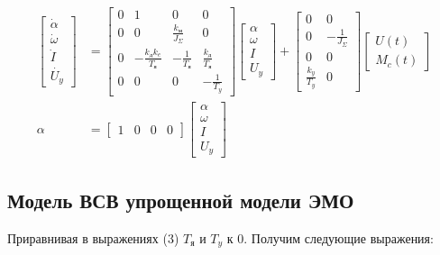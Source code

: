 \documentclass[a4paper, 12pt]{article}
\begin{document}
\begin{align}
    \begin{bmatrix}
        \dot{\alpha} \\
        \dot{\omega} \\
        \dot{I} \\
        \dot{U_y} 
    \end{bmatrix} & = 
    \begin{bmatrix}
        0 & 1 & 0 & 0 \\
        0 & 0 & \frac{k_\text{м}}{J_\Sigma} & 0 \\
        0 & -\frac{k_\text{д}k_e}{T_\text{я}} & - \frac{1}{T_\text{я}} & \frac{k_\text{д}}{T_\text{я}} \\
        0 & 0 & 0 & -\frac{1}{T_y}
    \end{bmatrix}
    \begin{bmatrix}
        \alpha \\
        \omega \\
        I \\
        U_y 
    \end{bmatrix} + 
    \begin{bmatrix}
        0 & 0 \\
        0 & - \frac{1}{J_\Sigma} \\
        0 & 0 \\
        \frac{k_y}{T_y} & 0
    \end{bmatrix}
    \begin{bmatrix}
        U(t) \\
        M_c(t)
    \end{bmatrix} \\
    \alpha & = 
    \begin{bmatrix}
        1 & 0 & 0 & 0
    \end{bmatrix}
    \begin{bmatrix}
        \alpha \\
        \omega \\
        I \\
        U_y 
    \end{bmatrix}
\end{align}

\subsection{Модель ВСВ упрощенной модели ЭМО}
\par Приравнивая в выражениях (3) $T_\text{я}$ и $T_y$ к 0. Получим следующие выражения:
\end{document}

